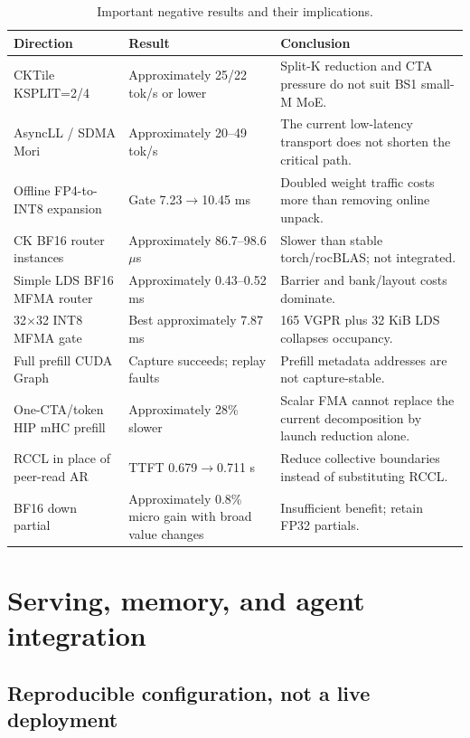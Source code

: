 \documentclass[sigplan,10pt]{acmart}
\begin{document}
\begin{table}[tp]
  \caption{Important negative results and their implications.}\label{tab:negative}
  \begin{tabularx}{\textwidth}{@{}p{}p{}Y@{}}
  \toprule
  Direction & Result & Conclusion \\
  \midrule
  CKTile KSPLIT=2/4 & Approximately 25/22 tok/s or lower & Split-K reduction and CTA pressure do not suit BS1 small-M MoE. \\
  AsyncLL / SDMA Mori & Approximately 20--49 tok/s & The current low-latency transport does not shorten the critical path. \\
  Offline FP4-to-INT8 expansion & Gate 7.23$\rightarrow$10.45 ms & Doubled weight traffic costs more than removing online unpack. \\
  CK BF16 router instances & Approximately 86.7--98.6 $\mu$s & Slower than stable torch/rocBLAS; not integrated. \\
  Simple LDS BF16 MFMA router & Approximately 0.43--0.52 ms & Barrier and bank/layout costs dominate. \\
  32$\times$32 INT8 MFMA gate & Best approximately 7.87 ms & 165 VGPR plus 32 KiB LDS collapses occupancy. \\
  Full prefill CUDA Graph & Capture succeeds; replay faults & Prefill metadata addresses are not capture-stable. \\
  One-CTA/token HIP mHC prefill & Approximately 28\% slower & Scalar FMA cannot replace the current decomposition by launch reduction alone. \\
  RCCL in place of peer-read AR & TTFT 0.679$\rightarrow$0.711 s & Reduce collective boundaries instead of substituting RCCL. \\
  BF16 down partial & Approximately 0.8\% micro gain with broad value changes & Insufficient benefit; retain FP32 partials. \\
  \bottomrule
  \end{tabularx}
\end{table}

\section{Serving, memory, and agent integration}

\subsection{Reproducible configuration, not a live deployment}
\end{document}
